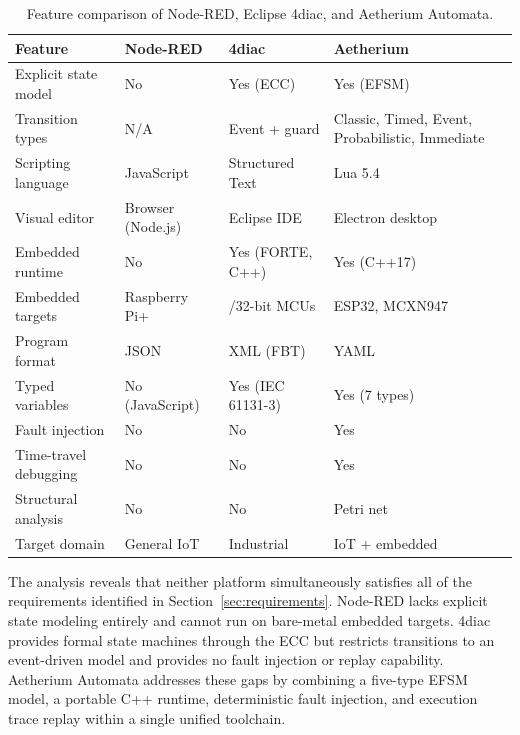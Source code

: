 \begin{table}[!htbp]
  \centering
  \caption{Feature comparison of Node-RED, Eclipse 4diac, and Aetherium Automata.}
  \label{tab:comparison}
  \vskip6pt
  \begin{tabularx}{\textwidth}{l>{\raggedright\arraybackslash}X>{\raggedright\arraybackslash}X>{\raggedright\arraybackslash}X}
    \toprule
    Feature & Node-RED & 4diac & Aetherium \\
    \midrule
    Explicit state model  & No               & Yes (ECC)             & Yes (EFSM) \\
    Transition types      & N/A              & Event + guard         & Classic, Timed, Event, Probabilistic, Immediate \\
    Scripting language    & JavaScript       & Structured Text       & Lua 5.4 \\
    Visual editor         & Browser (Node.js)& Eclipse IDE           & Electron desktop \\
    Embedded runtime      & No               & Yes (FORTE, C++)      & Yes (C++17) \\
    Embedded targets      & Raspberry Pi+    & 16/32-bit MCUs        & ESP32, MCXN947 \\
    Program format        & JSON             & XML (FBT)             & YAML \\
    Typed variables       & No (JavaScript)  & Yes (IEC 61131-3)     & Yes (7 types) \\
    Fault injection       & No               & No                    & Yes \\
    Time-travel debugging & No               & No                    & Yes \\
    Structural analysis   & No               & No                    & Petri net \\
    Target domain         & General IoT      & Industrial            & IoT + embedded \\
    \bottomrule
  \end{tabularx}
\end{table}

The analysis reveals that neither platform simultaneously satisfies all of the requirements identified in Section~\ref{sec:requirements}. Node-RED lacks explicit state modeling entirely and cannot run on bare-metal embedded targets. 4diac provides formal state machines through the ECC but restricts transitions to an event-driven model and provides no fault injection or replay capability. Aetherium Automata addresses these gaps by combining a five-type EFSM model, a portable C++ runtime, deterministic fault injection, and execution trace replay within a single unified toolchain.

